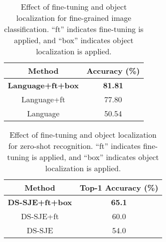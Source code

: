 \documentclass[10pt,twocolumn,letterpaper]{article}
\begin{document}
\begin{table}
   \begin{center}
   \begin{tabular} {|c|c|}
      \hline
      Method & Accuracy (\%)\\ 
      \hline
      \hline
      \textbf{Language+ft+box} & {\textbf{81.81}} \\ 
      \hline
      Language+ft & 77.80 \\
      \hline
      Language & 50.54 \\
      \hline
   \end{tabular}
   \end{center}
   \caption{Effect of fine-tuning and object localization for fine-grained image classification. ``ft'' indicates fine-tuning is applied, and ``box'' indicates object localization is applied.}
   \label{fine}
\end{table}

\begin{table}
   \begin{center}
   \begin{tabular} {|c|c|}
      \hline
      Method & Top-1 Accuracy (\%)\\ 
      \hline
      \hline
      \textbf{DS-SJE+ft+box} & {\textbf{65.1}} \\ 
      \hline
      DS-SJE+ft & 60.0 \\
      \hline
      DS-SJE \cite{deeprepresentations} & 54.0 \\
      \hline
   \end{tabular}
   \end{center}
   \caption{Effect of fine-tuning and object localization for zero-shot recognition. ``ft'' indicates fine-tuning is applied, and ``box'' indicates object localization is applied.}
   \label{zero}
\end{table}
\end{document}
